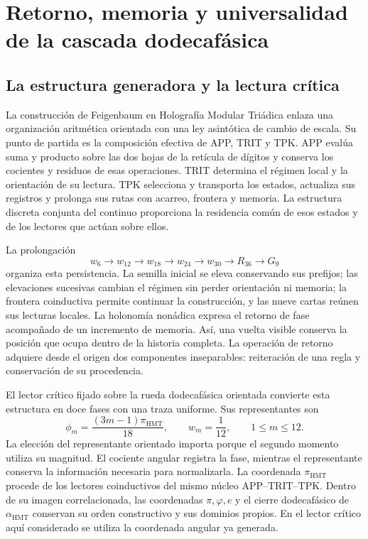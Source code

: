 \section{Retorno, memoria y universalidad de la cascada dodecafásica}
\label{sec:hmt-feig-interpretacion}

\subsection{La estructura generadora y la lectura crítica}

La construcción de Feigenbaum en Holografía Modular Triádica enlaza una
organización aritmética orientada con una ley asintótica de cambio de escala.
Su punto de partida es la composición efectiva de APP, TRIT y TPK. APP evalúa
suma y producto sobre las dos hojas de la retícula de dígitos y conserva los
cocientes y residuos de esas operaciones. TRIT determina el régimen local y
la orientación de su lectura. TPK selecciona y transporta los estados,
actualiza sus registros y prolonga sus rutas con acarreo, frontera y memoria.
La estructura discreta conjunta del continuo proporciona la residencia común
de esos estados y de los lectores que actúan sobre ellos.

La prolongación
\[
w_6\longrightarrow w_{12}\longrightarrow w_{18}
\longrightarrow w_{24}\longrightarrow w_{30}
\longrightarrow R_{36}\longrightarrow G_9
\]
organiza esta persistencia. La semilla inicial se eleva conservando sus
prefijos; las elevaciones sucesivas cambian el régimen sin perder orientación
ni memoria; la frontera coinductiva permite continuar la construcción, y las
nueve cartas reúnen sus lecturas locales. La holonomía nonádica expresa el
retorno de fase acompañado de un incremento de memoria. Así, una vuelta
visible conserva la posición que ocupa dentro de la historia completa. La
operación de retorno adquiere desde el origen dos componentes inseparables:
reiteración de una regla y conservación de su procedencia.

El lector crítico fijado sobre la rueda dodecafásica orientada convierte esta
estructura en doce fases con una traza uniforme. Sus representantes son
\[
\phi_m=\frac{(3m-1)\pi_{\mathrm{HMT}}}{18},
\qquad w_m=\frac1{12},\qquad 1\le m\le12.
\]
La elección del representante orientado importa porque el segundo momento
utiliza su magnitud. El cociente angular registra la fase, mientras el
representante conserva la información necesaria para normalizarla. La
coordenada \(\pi_{\mathrm{HMT}}\) procede de los lectores coinductivos del mismo
núcleo APP--TRIT--TPK. Dentro de su imagen correlacionada, las coordenadas
\(\pi,\varphi,e\) y el cierre dodecafásico de \(\alpha_{\mathrm{HMT}}\)
conservan su orden constructivo y sus dominios propios. En el lector crítico
aquí considerado se utiliza la coordenada angular ya generada.

